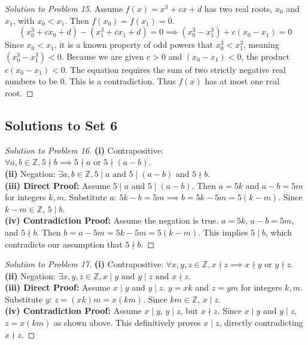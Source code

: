 \documentclass{article}
\begin{document}
\begin{proof}[Solution to Problem 15]
Assume $f(x) = x^3+cx+d$ has two real roots, $x_0$ and $x_1$, with $x_0 < x_1$. Then $f(x_0) = f(x_1) = 0$.
\[ (x_0^3 + cx_0 + d) - (x_1^3 + cx_1 + d) = 0 \implies (x_0^3 - x_1^3) + c(x_0 - x_1) = 0 \]
Since $x_0 < x_1$, it is a known property of odd powers that $x_0^3 < x_1^3$, meaning $(x_0^3 - x_1^3) < 0$. Because we are given $c > 0$ and $(x_0 - x_1) < 0$, the product $c(x_0 - x_1) < 0$. 
The equation requires the sum of two strictly negative real numbers to be $0$. This is a contradiction. Thus $f(x)$ has at most one real root.
\end{proof}

\subsection{Solutions to Set 6}
\begin{proof}[Solution to Problem 16]
\textbf{(i)} Contrapositive: $\forall a,b \in \mathbb{Z}, 5 \nmid b \implies 5 \nmid a \text{ or } 5 \nmid (a-b)$. \\
\textbf{(ii)} Negation: $\exists a,b \in \mathbb{Z}, 5 \mid a \text{ and } 5 \mid (a-b) \text{ and } 5 \nmid b$. \\
\textbf{(iii) Direct Proof:} Assume $5 \mid a$ and $5 \mid (a-b)$. Then $a = 5k$ and $a-b = 5m$ for integers $k,m$. Substitute $a$: $5k - b = 5m \implies b = 5k - 5m = 5(k-m)$. Since $k-m \in \mathbb{Z}$, $5 \mid b$. \\
\textbf{(iv) Contradiction Proof:} Assume the negation is true. $a = 5k$, $a-b = 5m$, and $5 \nmid b$. Then $b = a - 5m = 5k - 5m = 5(k-m)$. This implies $5 \mid b$, which contradicts our assumption that $5 \nmid b$.
\end{proof}

\begin{proof}[Solution to Problem 17]
\textbf{(i)} Contrapositive: $\forall x,y,z \in \mathbb{Z}, x \nmid z \implies x \nmid y \text{ or } y \nmid z$. \\
\textbf{(ii)} Negation: $\exists x,y,z \in \mathbb{Z}, x \mid y \text{ and } y \mid z \text{ and } x \nmid z$. \\
\textbf{(iii) Direct Proof:} Assume $x \mid y$ and $y \mid z$. $y = xk$ and $z = ym$ for integers $k,m$. Substitute $y$: $z = (xk)m = x(km)$. Since $km \in \mathbb{Z}$, $x \mid z$. \\
\textbf{(iv) Contradiction Proof:} Assume $x \mid y$, $y \mid z$, but $x \nmid z$. Since $x \mid y$ and $y \mid z$, $z = x(km)$ as shown above. This definitively proves $x \mid z$, directly contradicting $x \nmid z$.
\end{proof}
\end{document}
